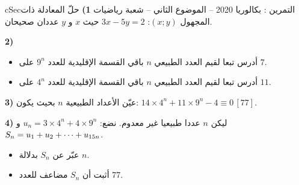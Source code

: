\documentclass[12pt,a4paper]{article}
\newenvironment{BOX}[2]{\begin{otherlanguage}{english}\begin{arbox}{#1}{#2}}{\end{arbox}\end{otherlanguage}}
\newcounter{exo}
\newenvironment{tamrin}[1]{\stepcounter{exo}\begin{BOX}{cSec}{التمرين \theexo: #1}}{\end{BOX}}
\renewcommand{\cdots}{\mathinner{\cdotp\cdotp\cdotp}}
\newenvironment{sq}{\begin{itemize}[leftmargin=2.4em,itemsep=3pt]}{\end{itemize}}
\newcommand{\qa}{\item[(أ)]}\newcommand{\qb}{\item[(ب)]}\newcommand{\qc}{\item[(جـ)]}\newcommand{\qd}{\item[(د)]}\newcommand{\qe}{\item[(هـ)]}
\begin{document}
\begin{tamrin}{بكالوريا 2020 -- الموضوع الثاني -- شعبة رياضيات}
\textbf{1)} حلّ المعادلة ذات المجهول $(x;y)$: $3x-5y=2$ حيث $x$ و $y$ عددان صحيحان.

\textbf{2)}
\begin{sq}
\qa أدرس تبعا لقيم العدد الطبيعي $n$ باقي القسمة الإقليدية للعدد $9^n$ على $7$.
\qb أدرس تبعا لقيم العدد الطبيعي $n$ باقي القسمة الإقليدية للعدد $4^n$ على $11$.
\end{sq}
\textbf{3)} عيّن الأعداد الطبيعية $n$ بحيث يكون: $14\times4^n+11\times9^n-4\equiv0\,[77]$.

\textbf{4)} ليكن $n$ عددا طبيعيا غير معدوم. نضع: $u_n=3\times4^n+4\times9^n$ و $S_n=u_1+u_2+\cdots+u_{15n}$.
\begin{sq}
\qa عبّر عن $S_n$ بدلالة $n$.
\qb أثبت أن $S_n$ مضاعف للعدد $77$.
\end{sq}
\end{tamrin}
\end{document}
